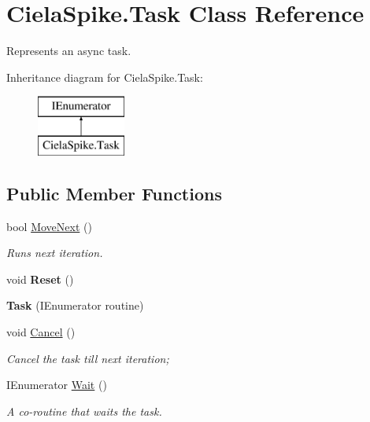 \hypertarget{class_ciela_spike_1_1_task}{}\section{Ciela\+Spike.\+Task Class Reference}
\label{class_ciela_spike_1_1_task}


Represents an async task.  


Inheritance diagram for Ciela\+Spike.\+Task\+:\begin{figure}[H]
\begin{center}
\leavevmode
\includegraphics[height=2.000000cm]{class_ciela_spike_1_1_task}
\end{center}
\end{figure}
\subsection*{Public Member Functions}
\begin{DoxyCompactItemize}
\item 
bool \hyperlink{class_ciela_spike_1_1_task_a7aa5e9ac9431e14540db93eadbbedd3f}{Move\+Next} ()
\begin{DoxyCompactList}\small\item\em Runs next iteration. \end{DoxyCompactList}\item 
\hypertarget{class_ciela_spike_1_1_task_abaa2e386621a8490e72f325d7a29920b}{}void {\bfseries Reset} ()\label{class_ciela_spike_1_1_task_abaa2e386621a8490e72f325d7a29920b}

\item 
\hypertarget{class_ciela_spike_1_1_task_a93dd2db76a6f8476fa1bdf4698827df6}{}{\bfseries Task} (I\+Enumerator routine)\label{class_ciela_spike_1_1_task_a93dd2db76a6f8476fa1bdf4698827df6}

\item 
void \hyperlink{class_ciela_spike_1_1_task_a441c75316841dbb5efef5902410d77d9}{Cancel} ()
\begin{DoxyCompactList}\small\item\em Cancel the task till next iteration; \end{DoxyCompactList}\item 
I\+Enumerator \hyperlink{class_ciela_spike_1_1_task_aabec45633d71b685190331089f612392}{Wait} ()
\begin{DoxyCompactList}\small\item\em A co-\/routine that waits the task. \end{DoxyCompactList}\end{DoxyCompactItemize}
